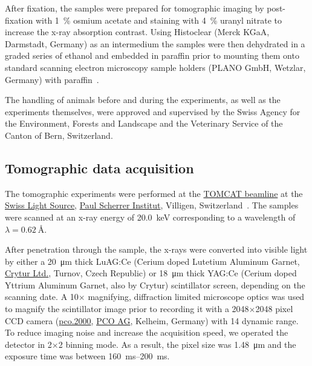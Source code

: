 \documentclass[twoside,paper=a4,abstract=true,english,DIV=calc]{scrartcl}
\begin{document}
After fixation, the samples were prepared for tomographic imaging by post-fixation with \SI{1}{\percent} osmium acetate and staining with \SI{4}{\percent} uranyl nitrate to increase the x-ray absorption contrast. Using Histoclear (Merck KGaA, Darmstadt, Germany) as an intermedium the samples were then dehydrated in a graded series of ethanol and embedded in paraffin prior to mounting them onto standard scanning electron microscopy sample holders (PLANO GmbH, Wetzlar, Germany) with paraffin~\cite{Tsuda2008}.

The handling of animals before and during the experiments, as well as the experiments themselves, were approved and supervised by the Swiss Agency for the Environment, Forests and Landscape and the Veterinary Service of the Canton of Bern, Switzerland.

\subsection{Tomographic data acquisition}
The tomographic experiments were performed at the \href{http://www.psi.ch/sls/tomcat/}{TOMCAT beamline} at the \href{http://www.psi.ch/sls/}{Swiss Light Source}, \href{http://www.psi.ch/}{Paul Scherrer Institut}, Villigen, Switzerland~\cite{Stampanoni2006a}. The samples were scanned at an x-ray energy of \SI{20.0}{\kilo\electronvolt} corresponding to a wavelength of \(\lambda=\SI{0.62}{\angstrom}\). %

After penetration through the sample, the x-rays were converted into visible light by either a \SI{20}{\micro\meter} thick LuAG:Ce (Cerium doped Lutetium Aluminum Garnet, \href{http://www.crytur.cz/}{Crytur Ltd.}, Turnov, Czech Republic) or \SI{18}{\micro\meter} thick YAG:Ce (Cerium doped Yttrium Aluminum Garnet, also by Crytur) scintillator screen, depending on the scanning date. A 10\(\times\) magnifying, diffraction limited microscope optics was used to magnify the scintillator image prior to recording it with a 2048\(\times\)2048 pixel CCD camera (\href{http://www.pco.de/sensitive-cameras/pco2000/}{pco.2000}, \href{http://www.pco.de/}{PCO AG}, Kelheim, Germany) with \SI{14}{\bit} dynamic range. To reduce imaging noise and increase the acquisition speed, we operated the detector in 2\(\times\)2 binning mode. As a result, the pixel size was \SI{1.48}{\micro\meter} and the exposure time was between \SIrange{160}{200}{\milli\second}.
\end{document}
